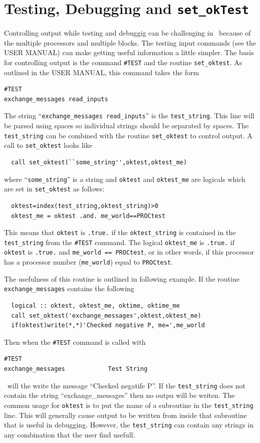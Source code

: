 \section{Testing, Debugging and {\tt set\_okTest} \label{section:tests}}

Controlling output while testing and debuggig can be challenging in \BATSRUS\ 
because of the multiple processors and multiple blocks.  
The testing input commands (see the USER MANUAL) can make getting useful 
information a little simpler.  The basis for controlling output is the 
command {\tt \#TEST} and the routine {\tt set\_oktest}.  As outlined in 
the USER MANUAL, this command takes the form
\begin{verbatim}
#TEST  
exchange_messages read_inputs
\end{verbatim}
The string ``{\tt exchange\_messages read\_inputs}'' is the {\tt test\_string}.
This line will be parsed using spaces so individual strings should be separated
by spaces.  The {\tt test\_string} can be combined with the routine 
{\tt set\_oktest} to control output.  A call to {\tt set\_oktest} looks like
\begin{verbatim}
  call set_oktest(``some_string'',oktest,oktest_me)
\end{verbatim}
where ``{\tt some\_string}'' is a string and {\tt oktest} and 
{\tt oktest\_me} are logicals which are set in {\tt set\_oktest} as follows:
\begin{verbatim}
  oktest=index(test_string,oktest_string)>0
  oktest_me = oktest .and. me_world==PROCtest
\end{verbatim}
This means that {\tt oktest} is {\tt .true.} if the 
{\tt oktest\_string} is contained in the {\tt test\_string} from the
{\tt \#TEST} command.  
The logical {\tt oktest\_me} is {\tt .true.} if 
{\tt oktest} is {\tt .true.} and {\tt me\_world == PROCtest}, or in other words,
if this processor has a processor number ({\tt me\_world}) equal to {\tt PROCtest}.

The usefulness of this routine is outlined in following example. 
If the routine {\tt exchange\_messages} contains the following
\begin{verbatim}
  logical :: oktest, oktest_me, oktime, oktime_me
  call set_oktest('exchange_messages',oktest,oktest_me)
  if(oktest)write(*,*)'Checked negative P, me=',me_world
\end{verbatim}
Then when the {\tt \#TEST} command is called with
\begin{verbatim}
#TEST  
exchange_messages            Test String
\end{verbatim}
\BATSRUS\ will the write the message ``Checked negatife P''.  If the {\tt test\_string}
does not contain the string ``exchange\_messages'' then no outpu will be writen.
The common usage for {\tt oktest} is to put the name of a subroutine 
in the {\tt test\_string} line.  This will generally cause output
to be written from inside that subroutine that is useful in debugging.
However, the {\tt test\_string} can contain any strings in any combination
that the user find usefull.


